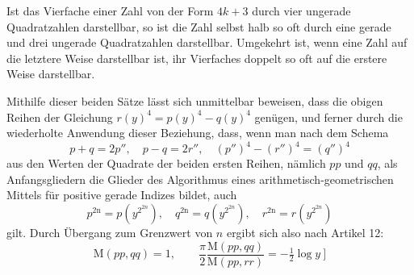 Ist das Vierfache einer Zahl von der Form $4k+3$ durch vier ungerade Quadratzahlen darstellbar, so ist die Zahl selbst halb so oft durch eine gerade und drei ungerade Quadratzahlen darstellbar. Umgekehrt ist, wenn eine Zahl auf die letztere Weise darstellbar ist, ihr Vierfaches doppelt so oft auf die erstere Weise darstellbar.

Mithilfe dieser beiden Sätze lässt sich unmittelbar beweisen, dass die obigen Reihen der Gleichung $r(y)^4=p(y)^4-q(y)^4$ genügen, und ferner durch %
die wiederholte Anwendung dieser Beziehung, dass, wenn man nach dem Schema
\[
p+q=2p'',\quad p-q=2r'',\quad(p'')^4-(r'')^4=(q'')^4
\]
aus den Werten der Quadrate der beiden ersten Reihen, nämlich $pp$ und $qq$, als Anfangsgliedern die Glieder des Algorithmus eines arithmetisch-geometrischen Mittels für positive gerade Indizes bildet, auch
\[
p^{2\mathrm n}=p(y^{2^{2n}}),\quad q^{2\mathrm n}=q(y^{2^{2n}}),\quad r^{2\mathrm n}=r(y^{2^{2n}})
\]
gilt. Durch Übergang zum Grenzwert von $n$ ergibt sich also nach Artikel 12:
\[
\mathrm M(pp,qq)=1,\qquad
\frac\pi2\frac{\mathrm M(pp,qq)}{\mathrm M(pp,rr)}=-\tfrac12\log y\ ]
\]

\clearpage
\endgroup
